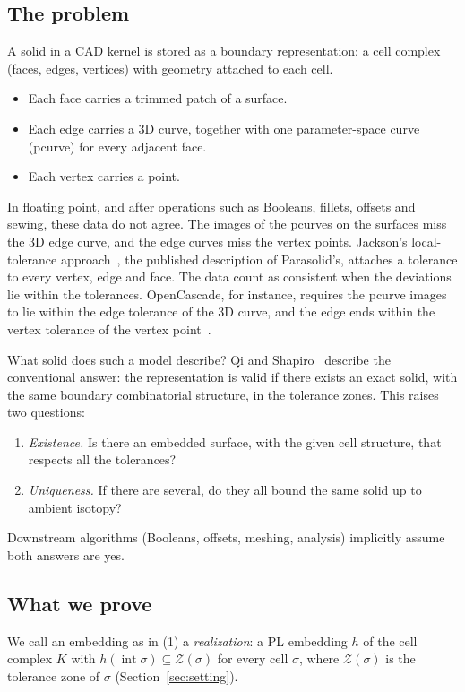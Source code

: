 \documentclass[preprint,12pt]{elsarticle}
\theoremstyle{definition}
\theoremstyle{remark}
\newcommand{\Z}{\mathcal{Z}}
\newcommand{\inter}{\operatorname{int}}
\begin{document}
\subsection{The problem}
A solid in a CAD kernel is stored as a boundary representation: a cell complex (faces, edges, vertices) with
geometry attached to each cell.
\begin{itemize}
\item Each face carries a trimmed patch of a surface.
\item Each edge carries a 3D curve, together with one parameter-space curve (pcurve) for every adjacent face.
\item Each vertex carries a point.
\end{itemize}
In floating point, and after operations such as Booleans, fillets, offsets and sewing, these data do not agree.
The images of the pcurves on the surfaces miss the 3D edge curve, and the edge curves miss the vertex points.
Jackson's local-tolerance approach~\cite{Jackson95}, the published description of Parasolid's, attaches a
tolerance to every vertex, edge and face. The data count as consistent when the deviations lie within the
tolerances. OpenCascade, for instance, requires the pcurve images to lie within the edge tolerance of the 3D curve,
and the edge ends within the vertex tolerance of the vertex point~\cite{OCCT}.

What solid does such a model describe? Qi and Shapiro~\cite{QiShapiro06b} describe the conventional answer: the
representation is valid if there exists an exact solid, with the same boundary combinatorial structure, in the
tolerance zones. This raises two questions:
\begin{enumerate}
\item \emph{Existence.} Is there an embedded surface, with the given cell structure, that respects all the
tolerances?
\item \emph{Uniqueness.} If there are several, do they all bound the same solid up to ambient isotopy?
\end{enumerate}
Downstream algorithms (Booleans, offsets, meshing, analysis) implicitly assume both answers are yes.

\subsection{What we prove}
We call an embedding as in (1) a \emph{realization}: a PL embedding $h$ of the cell complex $K$ with
$h(\inter\sigma)\subseteq\Z(\sigma)$ for every cell $\sigma$, where $\Z(\sigma)$ is the tolerance zone of $\sigma$
(Section~\ref{sec:setting}).
\end{document}
